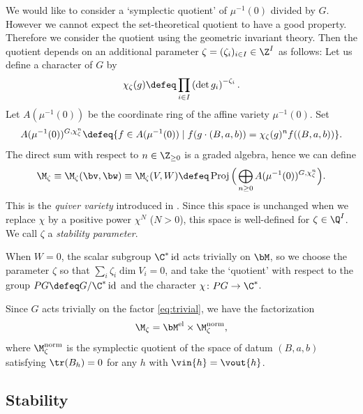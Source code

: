 We would like to consider a `symplectic quotient' of $\mu^{-1}(0)$
divided by $G$.
However we cannot expect the set-theoretical quotient
to have a good property. Therefore we consider the quotient using the
geometric invariant theory. Then the quotient depends on an additional
parameter $\zeta = (\zeta_i)_{i\in I}\in \Z^I$ as follows:
%
Let us def\/ine a character of $G$ by
\begin{equation*}
  \chi_\zeta(g) \defeq \prod_{i\in I} \left(\det g_i\right)^{-\zeta_i}.
\end{equation*}
Let $A(\mu^{-1}(0))$ be the coordinate ring of the af\/f\/ine variety
$\mu^{-1}(0)$. Set
\begin{equation*}
   A(\mu^{-1}(0))^{G,\chi_\zeta^n}
   \defeq \{ f\in A(\mu^{-1}(0)) \mid f(g\cdot(B,a,b))
   = \chi_\zeta(g)^n f((B,a,b)) \}.
\end{equation*}
The direct sum with respect to $n\in\Z_{\ge 0}$ is a graded algebra,
hence we can def\/ine
\begin{equation*}
   \M_\zeta \equiv \M_\zeta(\bv,\bw) \equiv \M_\zeta(V,W)
   \defeq \operatorname{Proj}\Big(\bigoplus_{n\ge 0}
   A(\mu^{-1}(0))^{G,\chi_\zeta^n}\Big).
\end{equation*}
This is the {\it quiver variety\/} introduced in \cite{Na-quiver}.
Since this space is unchanged when we replace $\chi$ by a positive power
$\chi^N$ ($N > 0$), this space is well-def\/ined for $\zeta\in \Q^I$.
We call $\zeta$ a {\it stability parameter}.

When $W = 0$, the scalar subgroup $\C^*\operatorname{id}$ acts
trivially on $\bM$, so we choose the parameter $\zeta$ so that
$\sum_i \zeta_i \dim V_i = 0$, and take the `quotient' with respect to
the group $PG \defeq G/\C^*\operatorname{id}$ and the character
$\chi\colon PG\to \C^*$.

Since $G$ acts trivially on the factor \eqref{eq:trivial}, we have the
factorization
\begin{equation}\label{eq:fac}
    \M_\zeta = \bM^{\text{el}} \times \M_\zeta^{\text{norm}},
\end{equation}
where $\M_\zeta^{\text{norm}}$ is the symplectic quotient of the space
of datum $(B,a,b)$ satisfying $\tr(B_h) = 0$ for any $h$ with $\vin{h}
= \vout{h}$.

\subsection{Stability}\label{subsec:stability}

